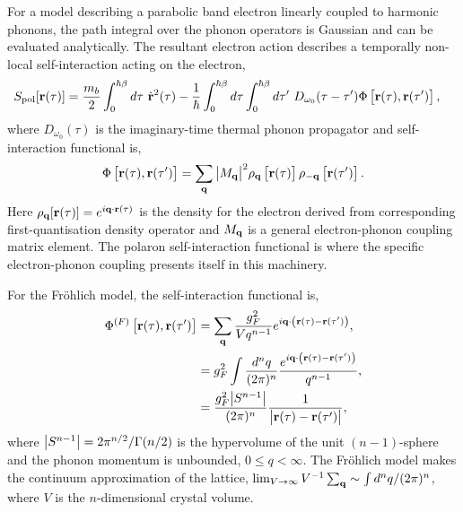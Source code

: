 For a model describing a parabolic band electron linearly coupled to harmonic phonons, the path integral over the phonon operators is Gaussian and can be evaluated analytically. The resultant electron action describes a temporally non-local self-interaction acting on the electron,
\begin{equation} \label{eqn:eph-action}
    \begin{aligned}
        S_{\text{pol}}[\vb{r}(\tau)] &= \frac{m_b}{2} \int_0^{\hbar\beta} d\tau\ \Dot{\vb{r}}^2(\tau) - \frac{1}{\hbar} \int_0^{\hbar\beta} d\tau \int_0^{\hbar\beta} d\tau'\ D_{\omega_0}(\tau - \tau') \Phi\left[\vb{r}(\tau), \vb{r}(\tau')\right] ,
    \end{aligned}
\end{equation}
where $ D_{\omega_0}(\tau)$ is the imaginary-time thermal phonon propagator and self-interaction functional is,
\begin{equation}
    \Phi\left[\vb{r}(\tau), \vb{r}(\tau')\right] = \sum_{\vb{q}} \abs{M_{\vb{q}}}^2 \rho_{\vb{q}} \left[\vb{r}(\tau)\right] \rho_{\vb{-q}}\left[\vb{r}(\tau')\right].
\end{equation}
Here $\rho_{\vb{q}}[\vb{r}(\tau)] = e^{i \vb{q} \cdot \vb{r}(\tau)}$ is the density for the electron derived from corresponding first-quantisation density operator and $M_{\vb{q}}$ is a general electron-phonon coupling matrix element. The polaron self-interaction functional is where the specific electron-phonon coupling presents itself in this machinery. 

For the Fr\"ohlich model, the self-interaction functional is,
\begin{equation}
    \begin{aligned}
        \Phi^{(F)}\left[\vb{r}(\tau), \vb{r}(\tau')\right] &= \sum_{\vb{q}} \frac{g_{F}^2}{V q^{n-1}} e^{i \vb{q} \cdot \left(\vb{r}(\tau) - \vb{r}(\tau') \right)} , \\
        &= g_{F}^2 \int \frac{d^n q}{(2\pi)^n} \frac{e^{i\vb{q}\cdot\left(\vb{r}(\tau) - \vb{r}(\tau')\right)}}{q^{n-1}} , \\
        &= \frac{g^2_F \abs{S^{n-1}}}{(2\pi)^{n}} \frac{1}{\abs{\vb{r}(\tau) - \vb{r}(\tau')}} ,
    \end{aligned}
\end{equation}
where $\abs{S^{n-1}} = 2\pi^{n/2}/\Gamma(n/2)$ is the hypervolume of the unit $(n-1)$-sphere and the phonon momentum is unbounded, $0 \leq q < \infty$. The Fr\"ohlich model makes the continuum approximation of the lattice, $\lim_{V \to \infty} V^{-1}\sum_{\vb{q}} \sim \int d^nq / (2\pi)^n$, where $V$ is the $n$-dimensional crystal volume.

